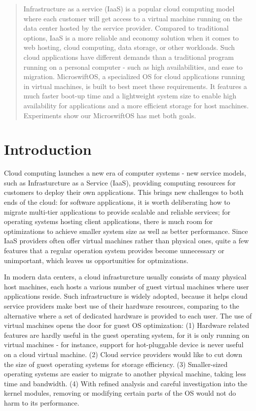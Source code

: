 
\begin{abstract}
Infrastructure as a service (IaaS) is a popular cloud computing model where each customer will get access to a virtual machine running on the data center hosted by the service provider. Compared to traditional options, IaaS is a more reliable and economy solution when it comes to web hosting, cloud computing, data storage, or other workloads. Such cloud applications have different demands than a traditional program running on a personal computer - such as high availabilities, and ease to migration. MicroswiftOS, a specialized OS for cloud applications running in virtual machines, is built to best meet these requirements. It features a much faster boot-up time and a lightweight system size to enable high availability for applications and a more efficient storage for host machines. Experiments show our MicroswiftOS has met both goals.
\end{abstract}




\section{Introduction}
\label{sec:intro}
Cloud computing launches a new era of computer systems - new service models, such as Infrasturcture as a Service (IaaS), providing computing resources for customers to deploy their own applications. This brings new challenges to both ends of the cloud: for software applications, it is worth deliberating how to migrate multi-tier applications to provide scalable and reliable services\cite{zheng2014comma}; for operating systems hosting client applications, there is much room for optimizations to achieve smaller system size as well as better performance. Since IaaS providers often offer virtual machines rather than physical ones, quite a few features that a regular operation system provides become unnecessary or unimportant, which leaves us opportunities for optmizations.

In modern data centers, a cloud infrasturcture usually consists of many physical host machines, each hosts a various number of guest virtual machines where user applications reside. Such infrastructure is widely adopted, because it helps cloud service providers make best use of their hardware resources, comparing to the alternative where a set of dedicated hardware is provided to each user. The use of virtual machines opens the door for guest OS optimization: (1) Hardware related features are hardly useful in the guest operating system, for it is only running on virtual machines - for instance, support for hot-pluggable device is never useful on a cloud virtual machine. (2) Cloud service providers would like to cut down the size of guest operating systems for storage efficiency. (3) Smaller-sized operating systems are easier to migrate to another physical machine, taking less time and bandwidth. (4) With refined analysis and careful investigation into the kernel modules, removing or modifying certain parts of the OS would not do harm to its performance.


